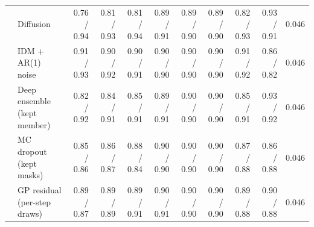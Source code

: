 \begin{longtable}{llrrrrrrrrr}
 & Diffusion & 0.76 / 0.94 & 0.81 / 0.93 & 0.81 / 0.94 & 0.89 / 0.91 & 0.89 / 0.90 & 0.89 / 0.90 & 0.82 / 0.93 & 0.93 / 0.91 & 0.046 \\
 & IDM + AR(1) noise & 0.91 / 0.93 & 0.90 / 0.92 & 0.90 / 0.91 & 0.90 / 0.90 & 0.90 / 0.90 & 0.90 / 0.90 & 0.91 / 0.92 & 0.86 / 0.82 & 0.046 \\
 & Deep ensemble (kept member) & 0.82 / 0.92 & 0.84 / 0.91 & 0.85 / 0.91 & 0.89 / 0.91 & 0.90 / 0.90 & 0.90 / 0.90 & 0.85 / 0.91 & 0.93 / 0.92 & 0.046 \\
 & MC dropout (kept masks) & 0.85 / 0.86 & 0.86 / 0.87 & 0.88 / 0.84 & 0.90 / 0.90 & 0.90 / 0.90 & 0.90 / 0.90 & 0.87 / 0.88 & 0.86 / 0.88 & 0.046 \\
 & GP residual (per-step draws) & 0.89 / 0.87 & 0.89 / 0.89 & 0.89 / 0.91 & 0.90 / 0.91 & 0.90 / 0.90 & 0.90 / 0.90 & 0.89 / 0.88 & 0.90 / 0.88 & 0.046 \\
\end{longtable}
\endgroup
